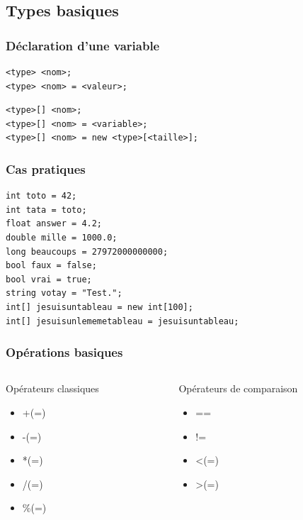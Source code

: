 \documentclass{beamer}
\begin{document}
\subsection{Types basiques}

\begin{frame}[fragile]
\frametitle{Déclaration d'une variable}
\begin{center}
\begin{lstlisting}
<type> <nom>;
<type> <nom> = <valeur>;
\end{lstlisting}
\pause
\begin{lstlisting}
<type>[] <nom>;
<type>[] <nom> = <variable>;
<type>[] <nom> = new <type>[<taille>];
\end{lstlisting}
\end{center}
\end{frame}

\begin{frame}[fragile]
\frametitle{Cas pratiques}
\begin{center}
\begin{lstlisting}
int toto = 42;
int tata = toto;
float answer = 4.2;
double mille = 1000.0;
long beaucoups = 27972000000000;
bool faux = false;
bool vrai = true;
string votay = "Test.";
int[] jesuisuntableau = new int[100];
int[] jesuisunlememetableau = jesuisuntableau;
\end{lstlisting}
\end{center}
\end{frame}

\begin{frame}[fragile]
\frametitle{Opérations basiques}
\begin{columns}[T]

\begin{column}{.48\textwidth}
Opérateurs classiques
\begin{itemize}
\item +(=)
\item -(=)
\item *(=)
\item /(=)
\item \%(=)
\end{itemize}
\end{column}

\hfill

\begin{column}{.48\textwidth}
Opérateurs de comparaison
\begin{itemize}
\item ==
\item !=
\item \textless (=)
\item \textgreater (=)
\end{itemize}
\end{column}

\end{columns}
\end{frame}
\end{document}
